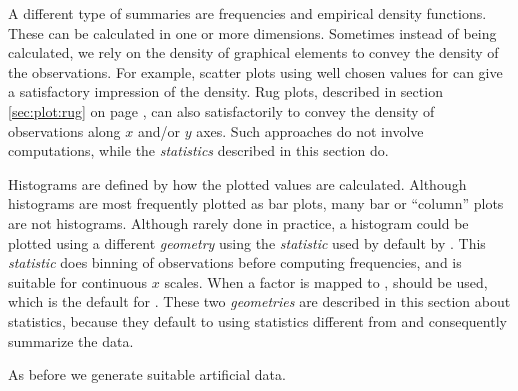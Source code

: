 \documentclass[krantz2]{krantz}\usepackage{knitr}%
\begin{document}
A different type of summaries are frequencies and empirical density functions. These can be calculated in one or more dimensions. Sometimes instead of being calculated, we rely on the density of graphical elements to convey the density of the observations. For example, scatter plots using well chosen values for  can give a satisfactory impression of the density. Rug plots, described in section \ref{sec:plot:rug} on page \pageref{sec:plot:rug}, can also satisfactorily to convey the density of observations along $x$ and/or $y$ axes. Such approaches do not involve computations, while the \emph{statistics} described in this section do.

Histograms are defined by how the plotted values are calculated. Although histograms are most frequently plotted as bar plots, many bar or ``column'' plots are not histograms. Although rarely done in practice, a histogram could be plotted using a different \emph{geometry} using  the \emph{statistic} used by default by . This \emph{statistic} does binning of observations before computing frequencies, and is suitable for continuous $x$ scales. When a factor is mapped to ,  should be used, which is the default  for . These two \emph{geometries} are described in this section about statistics, because they default to using statistics different from  and consequently summarize the data.

As before we generate suitable artificial data.

\begin{knitrout}\footnotesize
{}\color{fgcolor}\begin{kframe}
\begin{alltt}
\hlstd{(}\hlstd{)}
 \hlkwb{<-}
\hlstd{(} \hlstd{=} \hlstd{(}\hlstd{),}
 \hlstd{=} \hlstd{(}\hlstd{(}\hlstd{,} \hlopt{-}\hlstd{,} \hlstd{),} \hlstd{(}\hlstd{,} \hlstd{,} \hlstd{)),}
 \hlstd{=} \hlstd{(}\hlstd{(}\hlstd{(}\hlstd{,} \hlstd{),} \hlstd{(}\hlstd{,} \hlstd{))) )}
\end{alltt}
\end{kframe}
\end{knitrout}
\end{document}

